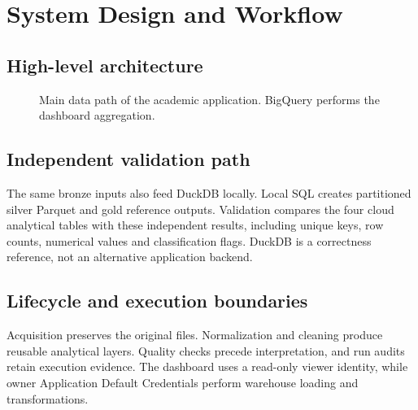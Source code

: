 \documentclass[11pt,a4paper]{article}
\begin{document}
\newpage
\section{System Design and Workflow}
\subsection{High-level architecture}
\begin{figure}[H]\centering
{}
\caption{Main data path of the academic application. BigQuery performs the dashboard aggregation.}
\end{figure}

\subsection{Independent validation path}
The same bronze inputs also feed DuckDB locally. Local SQL creates partitioned silver Parquet and gold reference outputs. Validation compares the four cloud analytical tables with these independent results, including unique keys, row counts, numerical values and classification flags. DuckDB is a correctness reference, not an alternative application backend.

\subsection{Lifecycle and execution boundaries}
Acquisition preserves the original files. Normalization and cleaning produce reusable analytical layers. Quality checks precede interpretation, and run audits retain execution evidence. The dashboard uses a read-only viewer identity, while owner Application Default Credentials perform warehouse loading and transformations.
\end{document}
